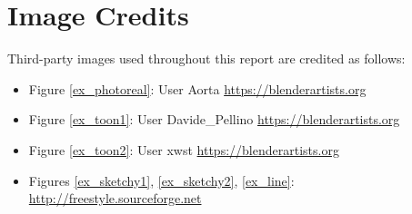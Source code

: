 \chapter{Image Credits}\label{appendix_credits}

Third-party images used throughout this report are credited as follows:

\begin{itemize}
	\item{Figure \ref{ex_photoreal}: User Aorta \url{https://blenderartists.org}}
	\item{Figure \ref{ex_toon1}: User Davide\_Pellino \url{https://blenderartists.org}}
	\item{Figure \ref{ex_toon2}: User xwst \url{https://blenderartists.org}}
	\item{Figures \ref{ex_sketchy1}, \ref{ex_sketchy2}, \ref{ex_line}: \url{http://freestyle.sourceforge.net}}
\end{itemize}